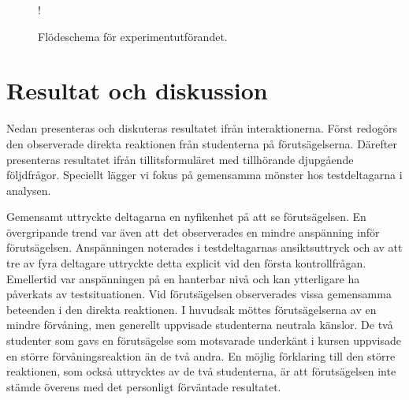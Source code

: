 \begin{center}
\begin{figure}[hbtp]
    \centering
    \hspace{-20px}
    \resizebox {\textwidth} {!} {
        
    }
    \caption{Flödeschema för experimentutförandet.}
    \label{fig:raket8}
\end{figure}
\end{center}

\section{Resultat och diskussion}
\label{sec: inter-RD}
Nedan presenteras och diskuteras resultatet ifrån interaktionerna. Först redogörs den observerade direkta reaktionen från studenterna på förutsägelserna. Därefter presenteras resultatet ifrån tillitsformuläret med tillhörande djupgående följdfrågor. Speciellt lägger vi fokus på gemensamma mönster hos testdeltagarna i analysen.

Gemensamt uttryckte deltagarna en nyfikenhet på att se förutsägelsen. En övergripande trend var även att det observerades en mindre anspänning inför förutsägelsen. Anspänningen noterades i testdeltagarnas ansiktsuttryck och av att tre av fyra deltagare uttryckte detta explicit vid den första kontrollfrågan. Emellertid var anspänningen på en hanterbar nivå och kan ytterligare ha påverkats av testsituationen. Vid förutsägelsen observerades vissa gemensamma beteenden i den direkta reaktionen. I huvudsak möttes förutsägelserna av en mindre förvåning, men generellt uppvisade studenterna neutrala känslor. De två studenter som gavs en förutsägelse som motsvarade underkänt i kursen uppvisade en större förvåningsreaktion än de två andra. En möjlig förklaring till den större reaktionen, som också uttrycktes av de två studenterna, är att förutsägelsen inte stämde överens med det personligt förväntade resultatet.

